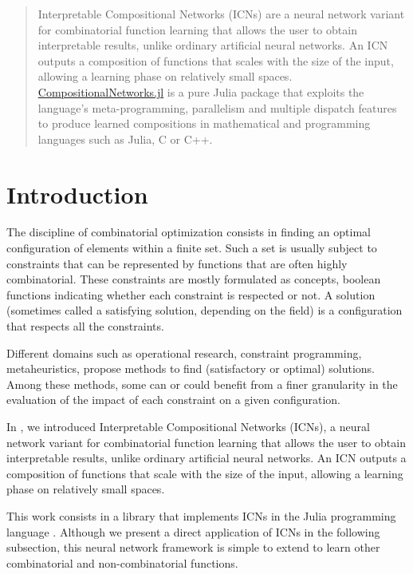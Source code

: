 \documentclass{juliacon}
\newcommand{\cnjl}{\href{https://github.com/JuliaConstraints/CompositionalNetworks.jl}{CompositionalNetworks.jl}\xspace}
\begin{document}


\maketitle

\begin{abstract}
  Interpretable Compositional Networks (ICNs) are a neural network variant for combinatorial function learning that allows the user to obtain interpretable results, unlike ordinary artificial neural networks. An ICN outputs a composition of functions that scales with the size of the input, allowing a learning phase on relatively small spaces.
  \cnjl is a pure Julia package that exploits the language's meta-programming, parallelism and multiple dispatch features to produce learned compositions in mathematical and programming languages such as Julia, C or C++.
\end{abstract}

\section{Introduction}
\label{sec:introduction}

The discipline of combinatorial optimization consists in finding an optimal configuration of elements within a finite set. Such a set is usually subject to constraints that can be represented by functions that are often highly combinatorial. These constraints are mostly formulated as concepts, boolean functions indicating whether each constraint is respected or not. A solution (sometimes called a satisfying solution, depending on the field) is a configuration that respects all the constraints.

Different domains such as operational research, constraint programming, metaheuristics, propose methods to find (satisfactory or optimal) solutions. Among these methods, some can or could benefit from a finer granularity in the evaluation of the impact of each constraint on a given configuration.

In \cite{richoux2020automatic}, we introduced Interpretable Compositional Networks (ICNs), a neural network variant for combinatorial function learning that allows the user to obtain interpretable results, unlike ordinary artificial neural networks. An ICN outputs a composition of functions that scale with the size of the input, allowing a learning phase on relatively small spaces.

This work consists in a library that implements ICNs in the Julia programming language \cite{bezanson2017julia}. Although we present a direct application of ICNs in the following subsection, this neural network framework is simple to extend to learn other combinatorial and non-combinatorial functions.
\end{document}

